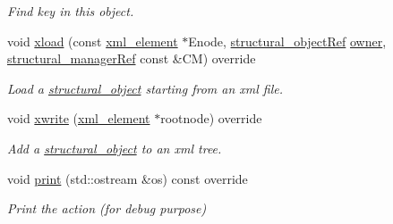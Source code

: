 \begin{DoxyCompactItemize}
\begin{DoxyCompactList}\small\item\em Find key in this object. \end{DoxyCompactList}\item 
void \hyperlink{classaction__o_ab48f20e726813634d18e4702b199874b}{xload} (const \hyperlink{classxml__element}{xml\+\_\+element} $\ast$Enode, \hyperlink{structural__objects_8hpp_a8ea5f8cc50ab8f4c31e2751074ff60b2}{structural\+\_\+object\+Ref} \hyperlink{classstructural__object_a3e96b3e00b8a78adfc44872d82e186ea}{owner}, \hyperlink{structural__manager_8hpp_ab3136f0e785d8535f8d252a7b53db5b5}{structural\+\_\+manager\+Ref} const \&CM) override
\begin{DoxyCompactList}\small\item\em Load a \hyperlink{classstructural__object}{structural\+\_\+object} starting from an xml file. \end{DoxyCompactList}\item 
void \hyperlink{classaction__o_ace0907025534f0523c2f322a24f36ac8}{xwrite} (\hyperlink{classxml__element}{xml\+\_\+element} $\ast$rootnode) override
\begin{DoxyCompactList}\small\item\em Add a \hyperlink{classstructural__object}{structural\+\_\+object} to an xml tree. \end{DoxyCompactList}\item 
void \hyperlink{classaction__o_ab40aedb1cdbac2ac73d613b1036e4b43}{print} (std\+::ostream \&os) const override
\begin{DoxyCompactList}\small\item\em Print the action (for debug purpose) \end{DoxyCompactList}\end{DoxyCompactItemize}
